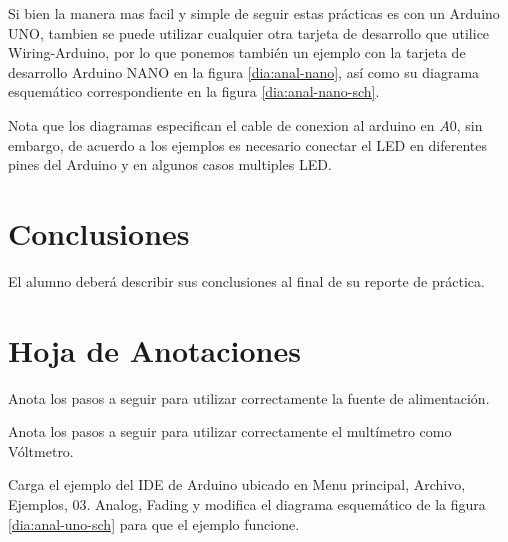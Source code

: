 		Si bien la manera mas facil y simple de seguir estas prácticas es con un Arduino UNO, tambien se puede utilizar cualquier otra tarjeta de desarrollo que utilice Wiring-Arduino, por lo que ponemos también un ejemplo con la tarjeta de desarrollo Arduino NANO en la figura \ref{dia:anal-nano}, así como su diagrama esquemático correspondiente en la figura \ref{dia:anal-nano-sch}.

		Nota que los diagramas especifican el cable de conexion al arduino en $A0$, sin embargo, de acuerdo a los ejemplos es necesario conectar el LED en diferentes pines del Arduino y en algunos casos multiples LED.


\section{Conclusiones}
	El alumno deberá describir sus conclusiones al final de su reporte de práctica.


\clearpage
\section{Hoja de Anotaciones}

	Anota los pasos a seguir para utilizar correctamente la fuente de alimentación. \\ \vspace{3cm}%

	Anota los pasos a seguir para utilizar correctamente el multímetro como Vóltmetro. \\ \vspace{3cm}%

	Carga el ejemplo del IDE de Arduino ubicado en Menu principal, Archivo, Ejemplos, 03. Analog, Fading y modifica el diagrama esquemático de la figura \ref{dia:anal-uno-sch} para que el ejemplo funcione. \\ \vspace{5cm}

